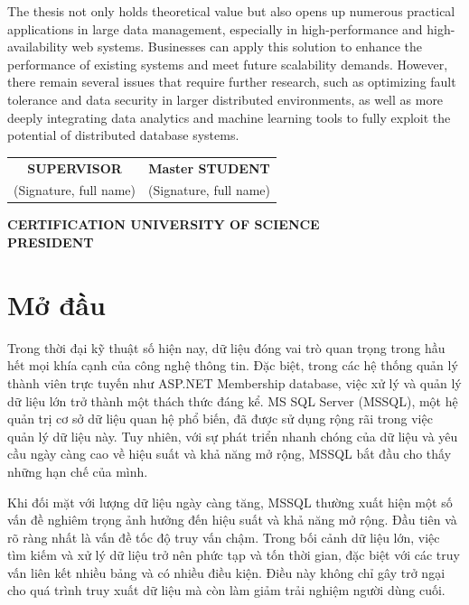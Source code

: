 \documentclass{article}[14pt]
\begin{document}
The thesis not only holds theoretical value but also opens up numerous practical applications in large data management, especially in high-performance and high-availability web systems. Businesses can apply this solution to enhance the performance of existing systems and meet future scalability demands. However, there remain several issues that require further research, such as optimizing fault tolerance and data security in larger distributed environments, as well as more deeply integrating data analytics and machine learning tools to fully exploit the potential of distributed database systems.

\begin{center}
    \begin{tabular}{c c}
        \textbf{SUPERVISOR} & \textbf{Master STUDENT} \\
        (Signature, full name) & (Signature, full name) \\
    \end{tabular}
    
    \vspace{3cm} %
    
    \textbf{CERTIFICATION UNIVERSITY OF SCIENCE} \\
    \textbf{PRESIDENT}
\end{center}

\pagebreak

    
    


    
\section{Mở đầu}


Trong thời đại kỹ thuật số hiện nay, dữ liệu đóng vai trò quan trọng trong hầu hết mọi khía cạnh của công nghệ thông tin. Đặc biệt, trong các hệ thống quản lý thành viên trực tuyến như ASP.NET Membership database, việc xử lý và quản lý dữ liệu lớn trở thành một thách thức đáng kể. MS SQL Server (MSSQL), một hệ quản trị cơ sở dữ liệu quan hệ phổ biến, đã được sử dụng rộng rãi trong việc quản lý dữ liệu này. Tuy nhiên, với sự phát triển nhanh chóng của dữ liệu và yêu cầu ngày càng cao về hiệu suất và khả năng mở rộng, MSSQL bắt đầu cho thấy những hạn chế của mình.

Khi đối mặt với lượng dữ liệu ngày càng tăng, MSSQL thường xuất hiện một số vấn đề nghiêm trọng ảnh hưởng đến hiệu suất và khả năng mở rộng. Đầu tiên và rõ ràng nhất là vấn đề tốc độ truy vấn chậm. Trong bối cảnh dữ liệu lớn, việc tìm kiếm và xử lý dữ liệu trở nên phức tạp và tốn thời gian, đặc biệt với các truy vấn liên kết nhiều bảng và có nhiều điều kiện. Điều này không chỉ gây trở ngại cho quá trình truy xuất dữ liệu mà còn làm giảm trải nghiệm người dùng cuối.
\end{document}

